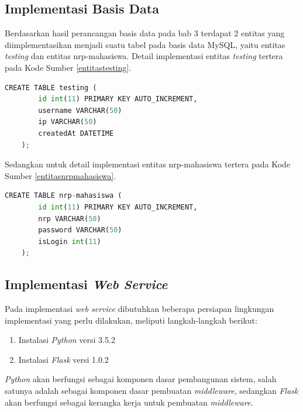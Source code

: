   \subsection{Implementasi Basis Data}
  Berdasarkan hasil perancangan basis data pada bab 3 terdapat 2 entitas yang diimplementasikan menjadi suatu tabel pada basis data MySQL, yaitu entitas \textit{testing} dan entitas nrp-mahasiswa. Detail implementasi entitas \textit{testing} tertera pada Kode Sumber \ref{entitastesting}.
  \newline
  \begin{minipage}{\linewidth}
  	\begin{lstlisting}[language=python, caption=\textit{Query} untuk membuat tabel testing,label=entitastesting]
  	CREATE TABLE testing (
	  	id int(11) PRIMARY KEY AUTO_INCREMENT,
	  	username VARCHAR(50)
	  	ip VARCHAR(50)
	  	createdAt DATETIME
  	);
  	\end{lstlisting}
  \end{minipage}
  Sedangkan untuk detail implementasi entitas nrp-mahasiswa tertera pada Kode Sumber \ref{entitasnrpmahasiswa}.
    \newline
    \begin{minipage}{\linewidth}
    \begin{lstlisting}[language=python, caption=\textit{Query} untuk membuat tabel testing,label=entitasnrpmahasiswa]
    CREATE TABLE nrp-mahasiswa (
    	id int(11) PRIMARY KEY AUTO_INCREMENT,
    	nrp VARCHAR(50)
    	password VARCHAR(50)
    	isLogin int(11)
    );
    \end{lstlisting}
    \end{minipage}
    
  \subsection{Implementasi \textit{Web Service}}
  Pada implementasi \textit{web service} dibutuhkan beberapa persiapan lingkungan implementasi yang perlu dilakukan, meliputi langkah-langkah berikut:
    \begin{enumerate}
    	\item Instalasi \textit{Python} versi 3.5.2
    	\item Instalasi \textit{Flask} versi 1.0.2
    \end{enumerate}
  \textit{Python} akan berfungsi sebagai komponen dasar pembangunan sistem, salah satunya adalah sebagai komponen dasar pembuatan \textit{middleware}, sedangkan \textit{Flask} akan berfungsi sebagai kerangka kerja untuk pembuatan \textit{middleware}.

